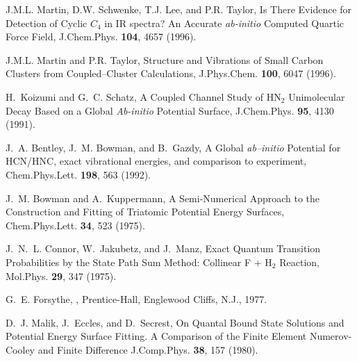 \begin{thebibliography}{999}
J.M.L. Martin, D.W. Schwenke, T.J. Lee, and P.R. Taylor,
Is There Evidence for Detection of Cyclic $C_4$ in IR spectra?
An Accurate {\it ab-initio} Computed Quartic Force Field,
J.Chem.Phys. {\bf 104}, 4657 (1996).

J.M.L. Martin and P.R. Taylor,
Structure and Vibrations of Small Carbon Clusters from 
Coupled--Cluster Calculations,
J.Phys.Chem. {\bf 100}, 6047 (1996).






H.~Koizumi and G.~C. Schatz,
A Coupled Channel Study of HN$_2$ Unimolecular Decay Based on a
Global {\it Ab-initio} Potential Surface,
\newblock J.Chem.Phys. {\bf 95}, 4130 (1991).

J.~A. Bentley, J.~M. Bowman, and B.~Gazdy,
A Global {\it ab--initio} Potential for HCN/HNC,
exact vibrational energies, and comparison to experiment,
\newblock Chem.Phys.Lett. {\bf 198}, 563 (1992).

J.~M. Bowman and A.~Kuppermann,
A Semi-Numerical Approach to the Construction and Fitting of Triatomic 
Potential Energy Surfaces,
\newblock Chem.Phys.Lett. {\bf 34}, 523 (1975).

J.~N.~L. Connor, W.~Jakubetz, and J.~Manz,
Exact Quantum Transition Probabilities by the State Path Sum Method:
Collinear F + H$_2$ Reaction,
\newblock Mol.Phys. {\bf 29}, 347 (1975).

G.~E. Forsythe,
,
\newblock Prentice-Hall, Englewood Cliffs, N.J., 1977.

D.~J. Malik, J.~Eccles, and D.~Secrest,
On Quantal Bound State Solutions and Potential Energy Surface Fitting.
A Comparison of the Finite Element Numerov-Cooley and Finite Difference 
\newblock J.Comp.Phys. {\bf 38}, 157 (1980).


\end{thebibliography}
